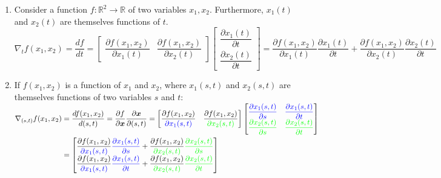 \begin{enumerate}
    \item Consider a function $f : \mathbb{R}^2 \to \mathbb{R}$ of two variables $x_1, x_2$. 
    Furthermore, $x_1(t)$ and $x_2(t)$ are themselves functions of $t$. 
    \\
    $
        \nabla_t f(x_1, x_2)
        = \dfrac{df}{dt}
        = \begin{bmatrix}
            \dfrac{\partial f(x_1, x_2)}{\partial x_1(t)} &
            \dfrac{\partial f(x_1, x_2)}{\partial x_2(t)}
        \end{bmatrix}
        \begin{bmatrix}
            \dfrac{\partial x_1(t)}{\partial t} \\
            \dfrac{\partial x_2(t)}{\partial t}
        \end{bmatrix}
        = \dfrac{\partial f(x_1, x_2)}{\partial x_1(t)} \dfrac{\partial x_1(t)}{\partial t}
        + \dfrac{\partial f(x_1, x_2)}{\partial x_2(t)} \dfrac{\partial x_2(t)}{\partial t}
    $
    \hfill \cite{mfml/book/mml/Deisenroth-Faisal-Ong}

    \item If $f (x_1, x_2)$ is a function of $x_1$ and $x_2$, where $x_1(s, t)$ and $x_2(s, t)$ are themselves functions of two variables $s$ and $t$:
    \\
    $
        \begin{aligned}
        \nabla_{(s,t)} f(x_1, x_2)
        &= \dfrac{df(x_1, x_2)}{d(s,t)}
        = \dfrac{\partial f}{\partial \bm{x}} \dfrac{\partial \bm{x}}{\partial (s,t)}
        = \begin{bmatrix}
            \dfrac{\partial f(x_1, x_2)}{\textcolor{blue}{\partial x_1(s,t)}} &
            \dfrac{\partial f(x_1, x_2)}{\textcolor{green}{\partial x_2(s,t)}}
        \end{bmatrix}
        \begin{bmatrix}
            \textcolor{blue}{\dfrac{\partial x_1(s,t)}{\partial s}} & \textcolor{blue}{\dfrac{\partial x_1(s,t)}{\partial t}} \\
            \textcolor{green}{\dfrac{\partial x_2(s,t)}{\partial s}} & \textcolor{green}{\dfrac{\partial x_2(s,t)}{\partial t}}
        \end{bmatrix}
        \\
        &= 
        \begin{bmatrix}
            \dfrac{\partial f(x_1, x_2)}{\textcolor{blue}{\partial x_1(s,t)}}
            \textcolor{blue}{\dfrac{\partial x_1(s,t)}{\partial s}} +
            \dfrac{\partial f(x_1, x_2)}{\textcolor{green}{\partial x_2(s,t)}}
            \textcolor{green}{\dfrac{\partial x_2(s,t)}{\partial s}} \\ 
            \dfrac{\partial f(x_1, x_2)}{\textcolor{blue}{\partial x_1(s,t)}}
            \textcolor{blue}{\dfrac{\partial x_1(s,t)}{\partial t}} +
            \dfrac{\partial f(x_1, x_2)}{\textcolor{green}{\partial x_2(s,t)}}
            \textcolor{green}{\dfrac{\partial x_2(s,t)}{\partial t}}
        \end{bmatrix}
        \end{aligned}
    $
    \hfill \cite{mfml/book/mml/Deisenroth-Faisal-Ong}
    

\end{enumerate}

